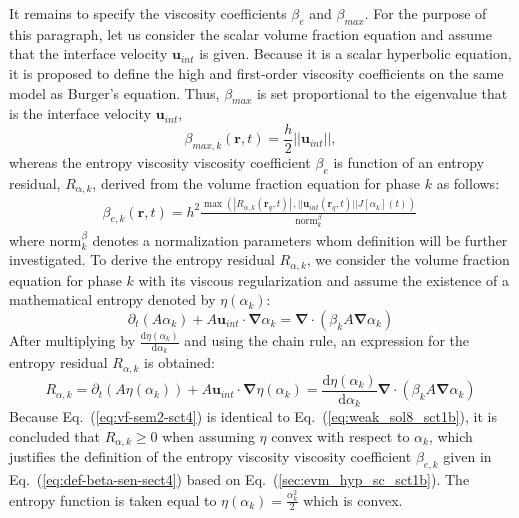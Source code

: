 \documentclass[preprint,10pt]{elsarticle}
\renewcommand{\div}{\mbold{\nabla}\! \cdot \!}
\newcommand{\grad}{\mbold{\nabla}}
\newcommand{\mbold}[1]{\boldsymbol#1}
\newcommand{\norm}{\textrm{norm}}
\newcommand{\eqt}[1]{Eq.~(\ref{#1})}                     %
\begin{document}
It remains to specify the viscosity coefficients $\beta_e$ and $\beta_{max}$. For the purpose of this paragraph, let us consider the scalar volume fraction equation and assume that the interface velocity $\mbold u_{int}$ is given. Because it is a scalar hyperbolic equation, it is proposed to define the high and first-order viscosity coefficients on the same model as Burger's equation. Thus, $\beta_{max}$ is set proportional to the eigenvalue that is the interface velocity $\mbold u_{int}$,
%
\begin{equation}\label{eq:def-beta-max-sen-sect4}
\beta_{max,k}( \mbold r, t) = \frac{h}{2} || \mbold u_{int} ||,
\end{equation}
%
whereas the entropy viscosity viscosity coefficient $\beta_e$ is function of an entropy residual, $R_{\alpha,k}$, derived from the volume fraction equation for phase $k$ as follows:
%
\begin{align}\label{eq:def-beta-sen-sect4}
\beta_{e,k}( \mbold r, t) = h^2 \frac{\max\left( | R_{\alpha,k}(\mbold r_q,t) |\,, || \mbold u_{int}(\mbold r_q,t) || J[\alpha_k](t) \right)}{\norm_{k}^\beta} \,
\end{align}
%
where $\norm_{k}^\beta$ denotes a normalization parameters whom definition will be further investigated. To derive the entropy residual $R_{\alpha,k}$, we consider the volume fraction equation for phase $k$ with its viscous regularization and assume the existence of a mathematical entropy denoted by $\eta(\alpha_k)$:
%
\begin{equation}\label{eq:vf-sem-sct4}
\partial_t \left(A \alpha_k \right) + A \mbold u_{int} \cdot \grad \alpha_k = \div \left( \beta_k A \grad \alpha_k \right)
\end{equation}
% 
After multiplying by $\frac{\text{d} \eta (\alpha_k)}{\text{d} \alpha_k}$ and using the chain rule, an expression for the entropy residual $R_{\alpha,k}$ is obtained:
%
\begin{equation}\label{eq:vf-sem2-sct4}
R_{\alpha,k} = \partial_t \left(A \eta(\alpha_k) \right) + A \mbold u_{int} \cdot \grad \eta(\alpha_k) = \frac{\text{d} \eta (\alpha_k)}{\text{d} \alpha_k} \div \left( \beta_k A \grad \alpha_k \right)
\end{equation}
% 
Because \eqt{eq:vf-sem2-sct4} is identical to \eqt{eq:weak_sol8_sct1b}, it is concluded that $R_{\alpha,k} \geq 0$ when assuming $\eta$ convex with respect to $\alpha_k$, which justifies the definition of the entropy viscosity viscosity coefficient $\beta_{e,k}$ given in \eqt{eq:def-beta-sen-sect4} based on \eqt{sec:evm_hyp_sc_sct1b}. The entropy function is taken equal to $\eta(\alpha_k) = \frac{\alpha_k^2}{2}$ which is convex.
%
\end{document}

